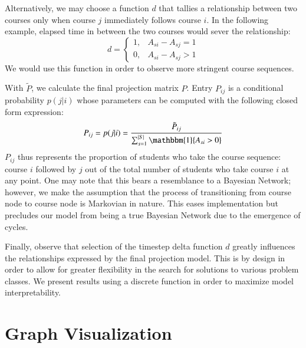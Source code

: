 \documentclass{sigchi}
\begin{document}
Alternatively, we may choose a function $d$ that tallies a relationship between two courses only when course $j$ immediately follows course $i$. In the following example, elapsed time in between the two courses would sever the relationship:
\begin{equation}
d = \begin{cases} 
      1, & A_{si} - A_{sj} = 1 \\
      0, & A_{si} - A_{sj} > 1 
    \end{cases}
\end{equation}
We would use this function in order to observe more stringent course sequences.

With $\tilde{P}$, we calculate the final projection matrix $P$. Entry $P_{ij}$ is a conditional probability $p(j|i)$ whose parameters can be computed with the following closed form expression:
\begin{equation}
    P_{ij} = p(j|i) = \frac{\tilde{P}_{ij}}{\sum_{s=1}^{|S|}\mathbbm{1}\{A_{si} > 0\}}
\end{equation}
$P_{ij}$ thus represents the proportion of students who take the course sequence: course $i$ followed by $j$ out of the total number of students who take course $i$ at any point. One may note that this bears a resemblance to a Bayesian Network; however, we make the assumption that the process of transitioning from course node to course node is Markovian in nature. This eases implementation but precludes our model from being a true Bayesian Network due to the emergence of cycles.

Finally, observe that selection of the timestep delta function $d$ greatly influences the relationships expressed by the final projection model. This is by design in order to allow for greater flexibility in the search for solutions to various problem classes. We present results using a discrete function in order to maximize model interpretability.

\section{Graph Visualization}
\label{sec:visualization}
\end{document}
